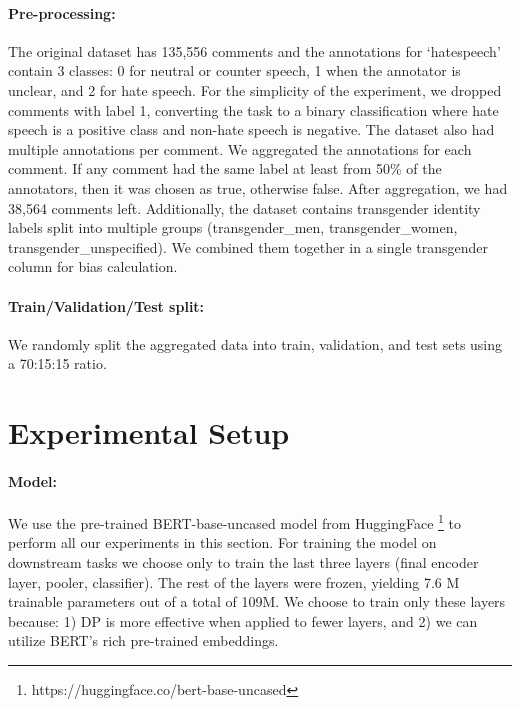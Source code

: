 \documentclass[11pt]{article} %
\begin{document}
\paragraph{Pre-processing:} 
The original dataset has 135,556 comments and the annotations for `hatespeech' contain 3 classes: 0 for neutral or counter speech, 1 when the annotator is unclear, and 2 for hate speech. For the simplicity of the experiment, we dropped comments with label 1, converting the task to a binary classification where hate speech is a positive class and non-hate speech is negative. The dataset also had multiple annotations per comment. We aggregated the annotations for each comment. If any comment had the same label at least from 50\% of the annotators, then it was chosen as true, otherwise false. After aggregation, we had 38,564 comments left. Additionally, the dataset contains transgender identity labels split into multiple groups (transgender\_men, transgender\_women, transgender\_unspecified). We combined them together in a single transgender column for bias calculation.

\paragraph{Train/Validation/Test split:} We randomly split the aggregated data into train, validation, and test sets using a 70:15:15 ratio.


\section{Experimental Setup \label{sec:experimental_setup}}

\paragraph{Model:} We use the pre-trained {BERT-base-uncased model} from HuggingFace \footnote{https://huggingface.co/bert-base-uncased} to perform all our experiments in this section. For training the model on downstream tasks we choose {only to train the last three layers (final encoder layer, pooler, classifier)}. The rest of the layers were frozen, yielding 7.6 M trainable parameters out of a total of 109M. We choose to train only these layers because: 1) DP is more effective when applied to fewer layers, and 2) we can utilize BERT's rich pre-trained embeddings. 
\end{document}
